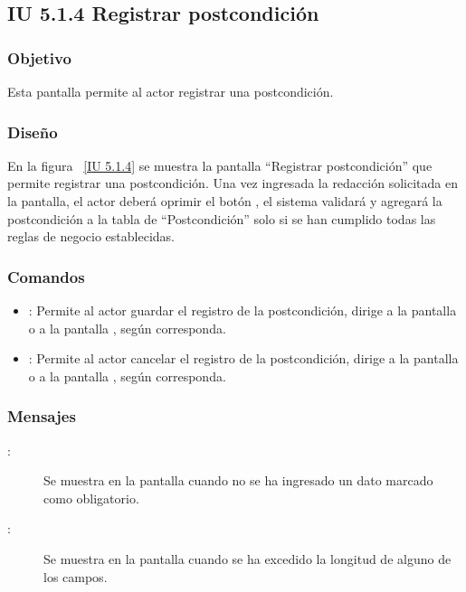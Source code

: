 \newpage 
\subsection{IU 5.1.4 Registrar postcondición}

\subsubsection{Objetivo}
	
	Esta pantalla permite al actor registrar una postcondición.

\subsubsection{Diseño}

    En la figura ~\ref{IU 5.1.4} se muestra la pantalla ``Registrar postcondición'' que permite registrar una postcondición.  
    Una vez ingresada la redacción solicitada en la pantalla, el actor deberá oprimir el botón 
    , el sistema validará y agregará la postcondición a la tabla de ``Postcondición'' solo si se han cumplido todas las reglas de negocio establecidas.  \\




\subsubsection{Comandos}
\begin{itemize}
	\item {}: Permite al actor guardar el registro de la postcondición, dirige a la pantalla  o a la pantalla , según corresponda.
	\item {}: Permite al actor cancelar el registro de la postcondición, dirige a la pantalla  o a la pantalla , según corresponda.
\end{itemize}

\subsubsection{Mensajes}

	
\begin{description}
	\item[ :] Se muestra en la pantalla  cuando no se ha ingresado un dato marcado como obligatorio.
	\item[ :] Se muestra en la pantalla  cuando se ha excedido la longitud de alguno de los campos.
\end{description}
